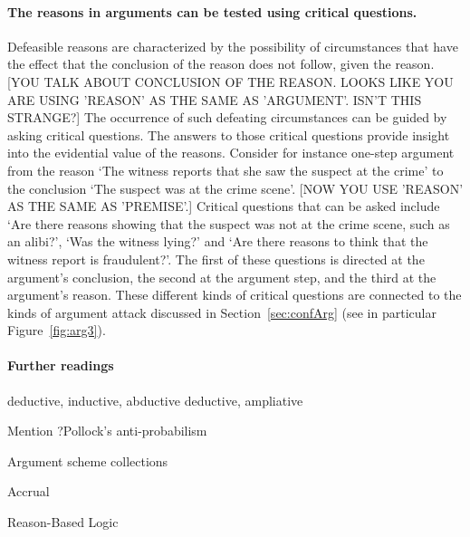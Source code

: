 \documentclass[10pt]{article}
\begin{document}
\paragraph{The reasons in arguments can be tested using critical questions.} Defeasible reasons are characterized by the possibility of circumstances that have the effect that the conclusion of the reason does not follow, given the reason. 
[YOU TALK ABOUT CONCLUSION OF THE REASON. LOOKS LIKE YOU ARE USING 'REASON' AS THE SAME AS 'ARGUMENT'. ISN'T THIS STRANGE?]
The occurrence of such defeating circumstances can be guided by asking critical questions. The answers to those critical questions provide insight into the evidential value of the reasons. Consider for instance one-step argument from the reason `The witness reports that she saw the suspect at the crime' to the conclusion `The suspect was at the crime scene'. [NOW YOU USE 'REASON' AS THE SAME AS 'PREMISE'.] 
Critical questions that can be asked include `Are there reasons showing that the suspect was not at the crime scene, such as an alibi?', `Was the witness lying?' and `Are there reasons to think that the witness report is fraudulent?'. The first of these questions is directed at the argument's conclusion, the second at the argument step, and the third at the argument's reason. These different kinds of critical questions are connected to the kinds of argument attack discussed in Section~\ref{sec:confArg} (see in particular Figure~\ref{fig:arg3}).

\paragraph{Further readings} 
deductive, inductive, abductive
deductive, ampliative

Mention ?Pollock's anti-probabilism

Argument scheme collections

Accrual

Reason-Based Logic
\end{document}

